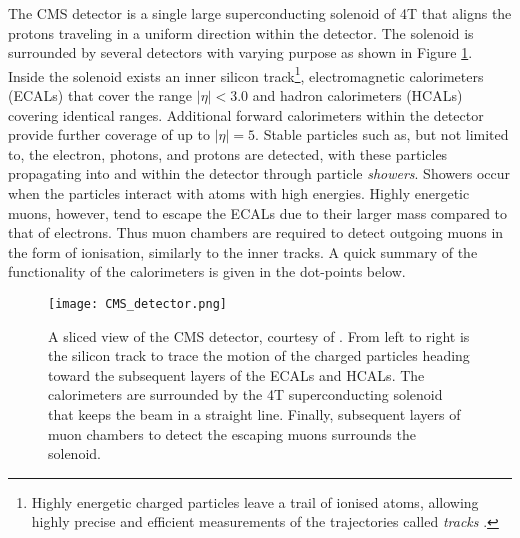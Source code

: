 The CMS detector \cite{chatrchyan2008cms} is a single large superconducting solenoid of 4T that aligns the protons traveling in a uniform direction within the detector. The solenoid is surrounded by several detectors with varying purpose as shown in Figure \ref{fig:detector}. Inside the solenoid exists an inner silicon track\footnote{Highly energetic charged particles leave a trail of ionised atoms, allowing highly precise and efficient measurements of the trajectories called \textit{tracks} \cite{chatrchyan2008cms}.}, electromagnetic calorimeters (ECALs) that cover the range $|\eta|<3.0$ and hadron calorimeters (HCALs) covering identical ranges. Additional forward calorimeters within the detector provide further coverage of up to $|\eta|=5$. Stable particles such as, but not limited to, the electron, photons, and protons are detected, with these particles propagating into and within the detector through particle \textit{showers}. Showers occur when the particles interact with atoms with high energies. Highly energetic muons, however, tend to escape the ECALs due to their larger mass compared to that of electrons. Thus muon chambers are required to detect outgoing muons in the form of ionisation, similarly to the inner tracks.  A quick summary of the functionality of the calorimeters is given in the dot-points below. 

\begin{figure}[htbp]
    \centering
    \texttt{[image: CMS\_detector.png]}
    \caption{A sliced view of the CMS detector, courtesy of \cite{ATLASandCMSDetector}. From left to right is the silicon track to trace the motion of the charged particles heading toward the subsequent layers of the ECALs and HCALs. The calorimeters are surrounded by the 4T superconducting solenoid that keeps the beam in a straight line. Finally, subsequent layers of muon chambers to detect the escaping muons surrounds the solenoid.}
    \label{fig:detector}
\end{figure}

